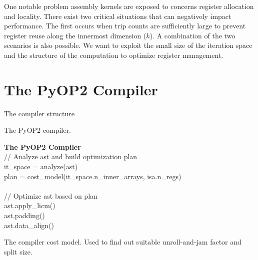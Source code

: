\documentclass[conference]{IEEEtran}
\begin{document}
One notable problem assembly kernels are exposed to concerns register allocation and locality. There exist two critical situations that can negatively impact performance. The first occurs when trip counts are sufficiently large to prevent register reuse along the innermost dimension ($k$). A combination of the two scenarios is also possible. We want to exploit the small size of the iteration space and the structure of the computation to optimize register management.




\clearpage

\section{The PyOP2 Compiler}

The compiler structure

\begin{algorithm}[t]
\caption{The PyOP2 compiler.}
\label{algo:PyOP2Compiler}
  \textbf{The PyOP2 Compiler}\\
// Analyze ast and build optimization plan \\
it\_space = analyze(ast) \\
plan = cost\_model(it\_space.n\_inner\_arrays, isa.n\_regs) \\
~~\\
// Optimize ast based on plan \\
ast.apply\_licm() \\
ast.padding() \\
ast.data\_align() \\
\end{algorithm}


The compiler cost model. Used to find out suitable unroll-and-jam factor and split size.
\end{document}
